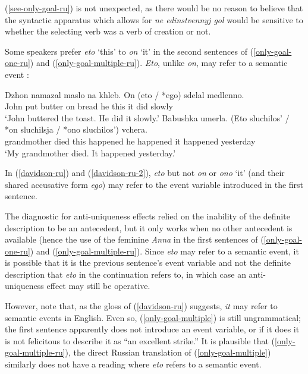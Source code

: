 \documentclass{article}
\begin{document}
(\ref{see-only-goal-ru}) is not unexpected, as there would be no reason to believe that the syntactic apparatus which allows for \textit{ne edinstvennyj gol} would be sensitive to whether the selecting verb was a verb of creation or not.

Some speakers prefer \textit{eto} `this' to \textit{on} `it' in the second sentences of (\ref{only-goal-one-ru}) and (\ref{only-goal-multiple-ru}). \textit{Eto}, unlike \textit{on}, may refer to a semantic event \citep{davidson67}:

\begin{exe}
	\ex \label{davidson-ru} \gll Dzhon namazal maslo na khleb. On (eto / *ego) sdelal medlenno.\\
	John put butter on bread he this {} it did slowly\\
	\glt `John buttered the toast. He did it slowly.'
	\ex \label{davidson-ru-2} \gll Babushka umerla. (Eto sluchilos' / *on sluchilsja / *ono sluchilos') vchera.\\
	grandmother died this happened {} he happened {} it happened yesterday \\
	\glt `My grandmother died. It happened yesterday.'
\end{exe}

In (\ref{davidson-ru}) and (\ref{davidson-ru-2}), \textit{eto} but not \textit{on} or \textit{ono} `it' (and their shared accusative form \textit{ego}) may refer to the event variable introduced in the first sentence.

The diagnostic for anti-uniqueness effects relied on the inability of the definite description to be an antecedent, but it only works when no other antecedent is available (hence the use of the feminine \textit{Anna} in the first sentences of (\ref{only-goal-one-ru}) and (\ref{only-goal-multiple-ru}). Since \textit{eto} may refer to a semantic event, it is possible that it is the previous sentence's event variable and not the definite description that \textit{eto} in the continuation refers to, in which case an anti-uniqueness effect may still be operative.

However, note that, as the gloss of (\ref{davidson-ru}) suggests, \textit{it} may refer to semantic events in English. Even so, (\ref{only-goal-multiple}) is still ungrammatical; the first sentence apparently does not introduce an event variable, or if it does it is not felicitous to describe it as ``an excellent strike.'' It is plausible that (\ref{only-goal-multiple-ru}), the direct Russian translation of (\ref{only-goal-multiple}) similarly does not have a reading where \textit{eto} refers to a semantic event.
\end{document}
